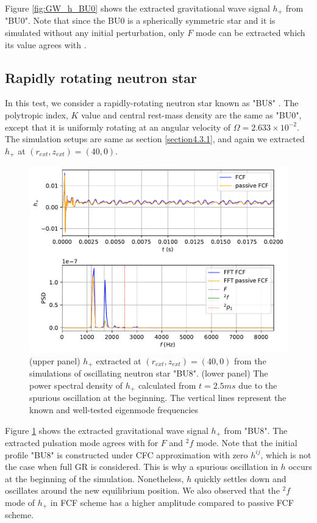 Figure \ref{fig:GW_h_BU0} shows the extracted gravitational wave signal $h_{+}$ from "BU0".
Note that since the BU0 is a spherically symmetric star and it is simulated without any initial perturbation,
only $F$ mode can be extracted which its value agrees with \cite{dimmelmeier2006non}.

\subsection{Rapidly rotating neutron star}
\label{section4.3.2}
In this test, we consider a rapidly-rotating neutron star known as "BU8" \cite{dimmelmeier2006non}.
The polytropic index, $K$ value and central rest-mass density are the same as "BU0",
except that it is uniformly rotating at an angular velocity of $\Omega = 2.633 \times 10^{-2}$.
The simulation setups are same as section \ref{section4.3.1},
and again we extracted $h_{+}$ at $(r_{ext}, z_{ext}) = (40, 0)$.\\
\begin{figure}[h!]
\centering
  \includegraphics[width=\linewidth]{GW_combine_h_BU8.pdf}
\caption{(upper panel) $h_{+}$ extracted at $(r_{ext}, z_{ext}) = (40, 0)$ from the simulations of oscillating neutron star "BU8".
(lower panel) The power spectral density of $h_{+}$ calculated from $t=2.5ms$ due to the spurious oscillation at the beginning.
The vertical lines represent the known and well-tested eigenmode frequencies \cite{dimmelmeier2006non}}
\label{fig:GW_h_BU8}
\end{figure}
Figure \ref{fig:GW_h_BU8} shows the extracted gravitational wave signal $h_{+}$ from "BU8".
The extracted pulsation mode agrees with \cite{dimmelmeier2006non} for $F$ and ${}^2f$ mode.
Note that the initial profile "BU8" is constructed under CFC approximation with zero $h^{ij}$,
which is not the case when full GR is considered.
This is why a spurious oscillation in $h$ occurs at the beginning of the simulation.
Nonetheless, $h$ quickly settles down and oscillates around the new equilibrium position.
We also observed that the ${}^2f$ mode of $h_+$ in FCF scheme has a higher amplitude compared to passive FCF scheme.

